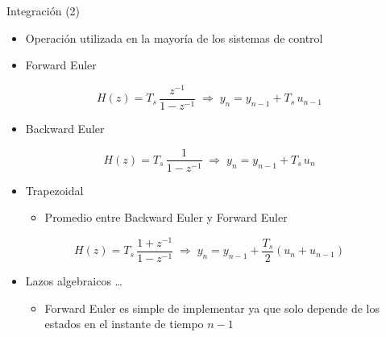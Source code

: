 \documentclass{beamer}
\begin{document}
\begin{frame}{Integración (2)}
\begin{itemize}
	\item Operación utilizada en la mayoría de los sistemas de control
	\item Forward Euler
\end{itemize}
\begin{equation*}
	H\left(z\right)=T_s \, \frac{z^{-1}}{1-z^{-1}} \;\Rightarrow\; y_n=y_{n-1}+T_s\,u_{n-1}
\end{equation*}
\begin{itemize}
	\item Backward Euler
\end{itemize}
\begin{equation*}
	H\left(z\right)=T_s \, \frac{1}{1-z^{-1}} \;\Rightarrow\; y_n=y_{n-1}+T_s\,u_{n}
\end{equation*}
\begin{itemize}
	\item Trapezoidal
	\begin{itemize}
		\item Promedio entre Backward Euler y Forward Euler
	\end{itemize}
\end{itemize}
\begin{equation*}
	H\left(z\right)=T_s \, \frac{1+z^{-1}}{1-z^{-1}} \;\Rightarrow\; y_n=y_{n-1}+\frac{T_s}{2}\left(u_{n}+u_{n-1}\right)
\end{equation*}
\begin{itemize}
	\item Lazos algebraicos \ldots
	\begin{itemize}
		\item Forward Euler es simple de implementar ya que solo depende de los estados en el instante de tiempo $n-1$
	\end{itemize}
\end{itemize}

\end{frame}
\end{document}

